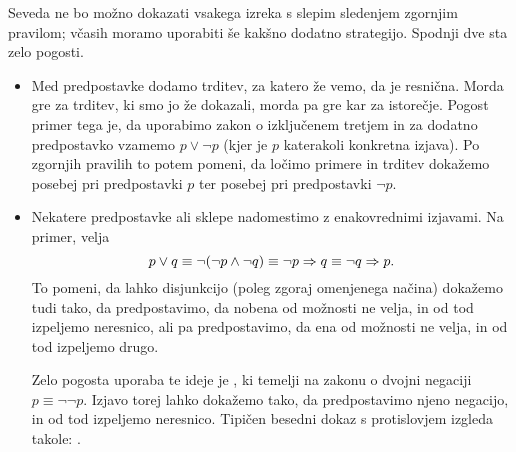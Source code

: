 	Seveda ne bo možno dokazati vsakega izreka s slepim sledenjem zgornjim pravilom; včasih moramo uporabiti še kakšno dodatno strategijo. Spodnji dve sta zelo pogosti.
	\begin{itemize}
		\item
			Med predpostavke dodamo trditev, za katero že vemo, da je resnična. Morda gre za trditev, ki smo jo že dokazali, morda pa gre kar za istorečje. Pogost primer tega je, da uporabimo zakon o izključenem tretjem in za dodatno predpostavko vzamemo $p \lor \lnot{p}$ (kjer je $p$ katerakoli konkretna izjava). Po zgornjih pravilih to potem pomeni, da ločimo primere in trditev dokažemo posebej pri predpostavki $p$ ter posebej pri predpostavki $\lnot{p}$.
		\item
			Nekatere predpostavke ali sklepe nadomestimo z enakovrednimi izjavami. Na primer, velja
			\[p \lor q \equiv \lnot(\lnot{p} \land \lnot{q}) \equiv \lnot{p} \Rightarrow q \equiv \lnot{q} \Rightarrow p.\]
			To pomeni, da lahko disjunkcijo (poleg zgoraj omenjenega načina) dokažemo tudi tako, da predpostavimo, da nobena od možnosti ne velja, in od tod izpeljemo neresnico, ali pa predpostavimo, da ena od možnosti ne velja, in od tod izpeljemo drugo.
			
			Zelo pogosta uporaba te ideje je , ki temelji na zakonu o dvojni negaciji $p \equiv \lnot\lnot{p}$. Izjavo torej lahko dokažemo tako, da predpostavimo njeno negacijo, in od tod izpeljemo neresnico. Tipičen besedni dokaz s protislovjem izgleda takole: .
	\end{itemize}
	
